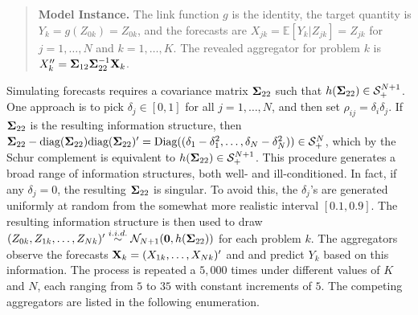 \documentclass[11pt]{article}
\newcommand{\E}{\mathbb{E}}
\newtheorem{proposition}[theorem]{Proposition}
\theoremstyle{definition}
\theoremstyle{definition}
\def\bSigma{{\bf \Sigma}}
\def\X{{\bf X}}
\def\Z{{\bf Z}}
\def\E{{\mathbb E}}
\def\diag{\text{diag}}
\def\Diag{\text{Diag}}
\def\diag{\text{diag}}
\begin{document}
\begin{quote}
{\bf Model Instance.}  The link function $g$ is the identity, the target quantity is $Y_k = g(Z_{0k}) = Z_{0k}$, and the forecasts are $X_{jk} = \E[Y_k | Z_{jk}] = Z_{jk}$ for $j = 1, \dots, N$ and $k = 1, \dots, K$. The revealed aggregator for problem $k$ is $X_k'' = \bSigma_{12} \bSigma_{22}^{-1} \X_k$. 
\end{quote}


Simulating forecasts requires a covariance matrix $\bSigma_{22}$ such that $h(\bSigma_{22}) \in \mathcal{S}_{+}^{N+1}$. 
One approach is to pick $\delta_j \in [0,1]$ for all $j = 1, \dots, N$, and then set $\rho_{ij} = \delta_i \delta_j$. If  $\bSigma_{22}$ is the resulting information structure, then $\bSigma_{22} - \diag(\bSigma_{22})\diag(\bSigma_{22})' = \Diag((\delta_1 - \delta_1^2, \dots, \delta_N - \delta_N^2)) \in \mathcal{S}_{+}^{N}$, which by the Schur complement is equivalent to $h(\bSigma_{22}) \in \mathcal{S}_{+}^{N+1}$. 
This procedure generates a broad range of information structures, both well- and ill-conditioned. In fact, if any $\delta_j = 0$, the resulting $\bSigma_{22}$ is singular.  To avoid this, the $\delta_j$'s are generated uniformly at random from the somewhat more realistic interval $[0.1, 0.9]$. The resulting information structure is then used to draw $(Z_{0k}, Z_{1k}, \dots, Z_{Nk})' \stackrel{i.i.d.}{\sim} \mathcal{N}_{N+1}(\boldsymbol{0}, h(\bSigma_{22}))$ for each problem $k$. The aggregators observe the forecasts $\X_k =  (X_{1k}, \dots, X_{Nk})'$ and 
 and predict $Y_{k}$ based on this information. The process is repeated a $5,000$ times under different values of $K$ and $N$, each ranging from $5$ to $35$ with constant increments of $5$. 
The competing aggregators are listed in the following enumeration.  
\end{document}
